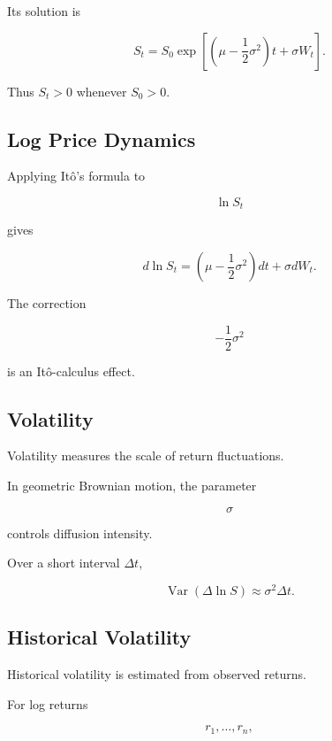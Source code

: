 Its solution is

\[
\boxed{
S_t
=
S_0
\exp
\left[
\left(
\mu-\frac12\sigma^2
\right)t
+
\sigma W_t
\right].
}
\]

Thus \(S_t>0\) whenever \(S_0>0\).

\subsection{Log Price Dynamics}
\label{subsec:log-price-dynamics}

Applying It\^o's formula to

\[
\ln S_t
\]

gives

\[
\boxed{
d\ln S_t
=
\left(
\mu-\frac12\sigma^2
\right)dt
+
\sigma dW_t.
}
\]

The correction

\[
-\frac12\sigma^2
\]

is an It\^o-calculus effect.

\subsection{Volatility}
\label{subsec:financial-volatility}

Volatility measures the scale of return fluctuations.

In geometric Brownian motion, the parameter

\[
\boxed{
\sigma
}
\]

controls diffusion intensity.

Over a short interval \(\Delta t\),

\[
\boxed{
\operatorname{Var}
(\Delta\ln S)
\approx
\sigma^2\Delta t.
}
\]

\subsection{Historical Volatility}
\label{subsec:historical-volatility}

Historical volatility is estimated from observed returns.

For log returns

\[
r_1,\ldots,r_n,
\]

